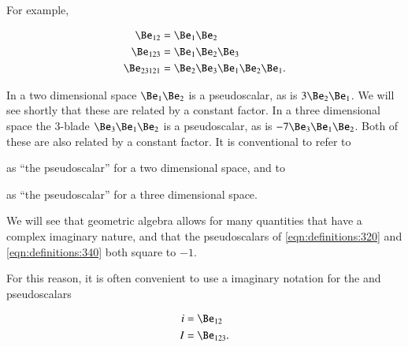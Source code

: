 
For example,

\begin{equation}\label{eqn:multivector:360}
\begin{aligned}
\Be_{12} &= \Be_1 \Be_2 \\
\Be_{123} &= \Be_1 \Be_2 \Be_3 \\
\Be_{23121} &= \Be_2 \Be_3 \Be_1 \Be_2 \Be_1.
\end{aligned}
\end{equation}


In a two dimensional space \( \Be_1 \Be_2 \) is a pseudoscalar, as is \( 3 \Be_2 \Be_1 \).
We will see shortly that these are related by a constant factor.
In a three dimensional space the 3-blade
\( \Be_3 \Be_1 \Be_2 \) is a pseudoscalar, as is \( - 7 \Be_3 \Be_1 \Be_2 \).
Both of these are also related by a constant factor.
It is conventional to refer to


as ``the pseudoscalar'' for a two dimensional space, and to


as ``the pseudoscalar'' for a three dimensional space.

We will see that geometric algebra allows for many quantities that have a complex imaginary nature, and that the pseudoscalars of \cref{eqn:definitions:320} and \cref{eqn:definitions:340} both square to \(-1\).

For this reason, it is often convenient to use a imaginary notation for the  and  pseudoscalars

\begin{dmath}\label{eqn:multivector_nomenclature:42}
\begin{aligned}
i &= \Be_{12} \\
I &= \Be_{123}.
\end{aligned}
\end{dmath}
